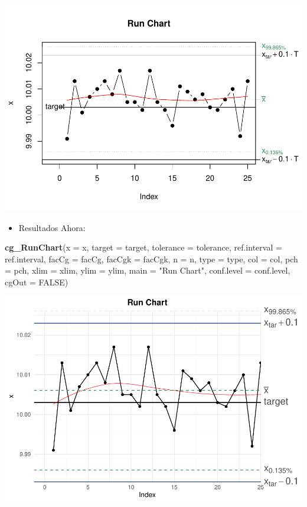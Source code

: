 \documentclass[
]{book}
\newenvironment{Shaded}{\begin{snugshade}}{\end{snugshade}}
\newcommand{\AttributeTok}[1]{\textcolor[rgb]{0.13,0.29,0.53}{#1}}
\newcommand{\ConstantTok}[1]{\textcolor[rgb]{0.56,0.35,0.01}{#1}}
\newcommand{\FunctionTok}[1]{\textcolor[rgb]{0.13,0.29,0.53}{\textbf{#1}}}
\newcommand{\NormalTok}[1]{#1}
\newcommand{\StringTok}[1]{\textcolor[rgb]{0.31,0.60,0.02}{#1}}
\providecommand{\tightlist}{%
  \setlength{\itemsep}{0pt}\setlength{\parskip}{0pt}}
\begin{document}
\includegraphics{Libro_TidyQualityTools_files/figure-latex/unnamed-chunk-144-1.pdf}

\begin{itemize}
\tightlist
\item
  Resultados Ahora:
\end{itemize}

\begin{Shaded}
\begin{Highlighting}[]
\FunctionTok{cg\_RunChart}\NormalTok{(}\AttributeTok{x =}\NormalTok{ x, }\AttributeTok{target =}\NormalTok{ target, }\AttributeTok{tolerance =}\NormalTok{ tolerance, }
                    \AttributeTok{ref.interval =}\NormalTok{ ref.interval, }\AttributeTok{facCg =}\NormalTok{ facCg, }\AttributeTok{facCgk =}\NormalTok{ facCgk, }
                    \AttributeTok{n =}\NormalTok{ n, }\AttributeTok{type =}\NormalTok{ type, }\AttributeTok{col =}\NormalTok{ col, }\AttributeTok{pch =}\NormalTok{ pch, }\AttributeTok{xlim =}\NormalTok{ xlim, }
                    \AttributeTok{ylim =}\NormalTok{ ylim, }\AttributeTok{main =} \StringTok{"Run Chart"}\NormalTok{, }\AttributeTok{conf.level =}\NormalTok{ conf.level, }\AttributeTok{cgOut =} \ConstantTok{FALSE}\NormalTok{)}
\end{Highlighting}
\end{Shaded}

\includegraphics{Libro_TidyQualityTools_files/figure-latex/unnamed-chunk-145-1.pdf}
\end{document}
